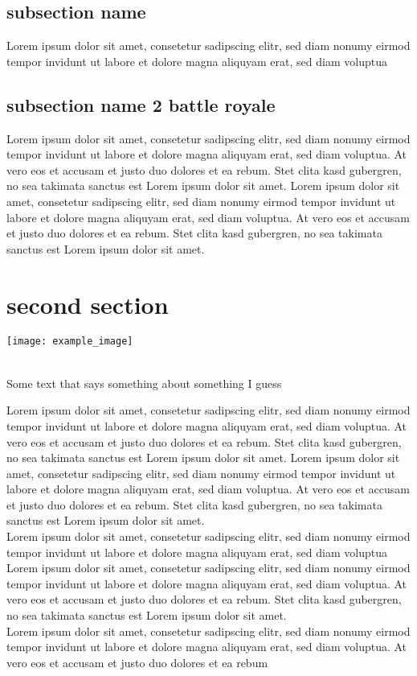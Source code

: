 \subsection{subsection name}
Lorem ipsum dolor sit amet, consetetur sadipscing elitr, sed diam nonumy eirmod tempor
invidunt ut labore et dolore magna aliquyam erat, sed diam voluptua


\subsection{subsection name 2 battle royale}
Lorem ipsum dolor sit amet, consetetur sadipscing elitr, sed diam nonumy eirmod tempor invidunt ut labore et dolore
magna aliquyam erat, sed diam voluptua. At vero eos et accusam et justo duo dolores et ea rebum. Stet clita kasd
gubergren, no sea takimata sanctus est Lorem ipsum dolor sit amet. Lorem ipsum dolor sit amet, consetetur sadipscing
elitr, sed diam nonumy eirmod tempor invidunt ut labore et dolore magna aliquyam erat, sed diam voluptua. At vero eos
et accusam et justo duo dolores et ea rebum. Stet clita kasd gubergren, no sea takimata sanctus est
Lorem ipsum dolor sit amet.

\section{second section}

\texttt{[image: example\_image]}
\begin{minipage}{\linewidth}
\end{minipage}
\\[0.5cm]
Some text that says something about something I guess

Lorem ipsum dolor sit amet, consetetur sadipscing elitr, sed diam nonumy eirmod tempor invidunt ut labore et dolore
magna aliquyam erat, sed diam voluptua. At vero eos et accusam et justo duo dolores et ea rebum. Stet clita kasd
gubergren, no sea takimata sanctus est Lorem ipsum dolor sit amet. Lorem ipsum dolor sit amet, consetetur sadipscing
elitr, sed diam nonumy eirmod tempor invidunt ut labore et dolore magna aliquyam erat, sed diam voluptua. At vero eos
et accusam et justo duo dolores et ea rebum. Stet clita kasd gubergren, no sea takimata sanctus est
Lorem ipsum dolor sit amet.
\\
Lorem ipsum dolor sit amet, consetetur sadipscing elitr, sed diam nonumy eirmod tempor
invidunt ut labore et dolore magna aliquyam erat, sed diam voluptua
\\[0.5cm]
Lorem ipsum dolor sit amet, consetetur sadipscing elitr, sed diam nonumy eirmod tempor invidunt ut labore et dolore
magna aliquyam erat, sed diam voluptua. At vero eos et accusam et justo duo dolores et ea rebum. Stet clita kasd
gubergren, no sea takimata sanctus est Lorem ipsum dolor sit amet.
\\[0.5cm]
Lorem ipsum dolor sit amet, consetetur sadipscing elitr, sed diam nonumy eirmod tempor invidunt ut labore
et dolore magna aliquyam erat, sed diam voluptua. At vero eos et accusam et justo duo dolores et ea rebum
